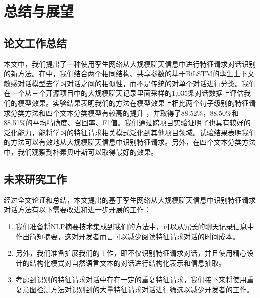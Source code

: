 \chapter{总结与展望}
\section{论文工作总结}
本文中，我们提出了一种使用孪生网络从大规模聊天信息中进行特征请求对话识别的新方法{\tool}。在{\tool}中，我们结合两个相同结构、共享参数的基于BiLSTM的孪生上下文敏感对话模型去学习对话之间的相似性，而不是传统的对单个对话进行分类。我们在一个从三个开源项目中的大规模聊天记录里面采样的1,035条对话数据上评估我们的模型效果。实验结果表明我们的方法在模型效果上相比两个句子级别的特征请求分类方法和四个文本分类模型有较高的提升 ，并取得了88.52\%，88.50\%和88.51\%的平均精确度、召回率、F1值。我们通过跨项目实验证明了{\tool}也具有较好的泛化能力，能将学习的特征请求相关模式泛化到其他项目领域。试验结果表明我们的方法可以有效地从大规模聊天信息中识别特征请求。另外，在四个文本分类方法中，我们观察到朴素贝叶斯可以取得最好的效果。

\section{未来研究工作}
经过全文论证和总结，本文提出的基于孪生网络从大规模聊天信息中识别特征请求对话方法有以下需要改进和进一步开展的工作：
\begin{enumerate}
    \item 我们准备将NLP摘要技术集成到我们的方法中，可以从冗长的聊天记录信息中作出简短摘要，这对开发者而言可以减少阅读特征请求对话的时间成本。
    \item 另外，我们准备扩展我们的工作，即不仅识别特征请求对话，并且使用精心设计的结构化模式对自然语言文本的对话进行结构化表示和信息抽取。
    \item 考虑到识别的特征请求对话中存在一定的重复特征请求，我们接下来将使用重复意图检测方法对识别到的大量特征请求对话进行筛选以减少开发者的工作。
\end{enumerate}